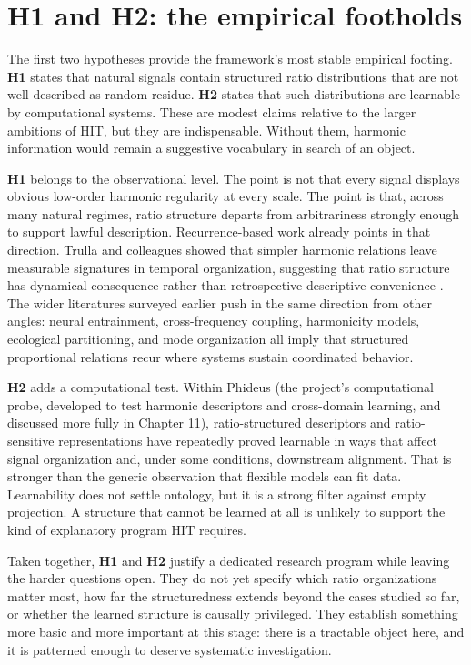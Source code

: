 \section{H1 and H2: the empirical footholds}

The first two hypotheses provide the framework's most stable empirical footing. \textbf{H1} states that natural signals contain structured ratio distributions that are not well described as random residue. \textbf{H2} states that such distributions are learnable by computational systems. These are modest claims relative to the larger ambitions of HIT, but they are indispensable. Without them, harmonic information would remain a suggestive vocabulary in search of an object.

\textbf{H1} belongs to the observational level. The point is not that every signal displays obvious low-order harmonic regularity at every scale. The point is that, across many natural regimes, ratio structure departs from arbitrariness strongly enough to support lawful description. Recurrence-based work already points in that direction. Trulla and colleagues showed that simpler harmonic relations leave measurable signatures in temporal organization, suggesting that ratio structure has dynamical consequence rather than retrospective descriptive convenience \parencite{trulla_2018}. The wider literatures surveyed earlier push in the same direction from other angles: neural entrainment, cross-frequency coupling, harmonicity models, ecological partitioning, and mode organization all imply that structured proportional relations recur where systems sustain coordinated behavior.

\textbf{H2} adds a computational test. Within Phideus (the project's computational probe, developed to test harmonic descriptors and cross-domain learning, and discussed more fully in Chapter 11), ratio-structured descriptors and ratio-sensitive representations have repeatedly proved learnable in ways that affect signal organization and, under some conditions, downstream alignment. That is stronger than the generic observation that flexible models can fit data. Learnability does not settle ontology, but it is a strong filter against empty projection. A structure that cannot be learned at all is unlikely to support the kind of explanatory program HIT requires.

Taken together, \textbf{H1} and \textbf{H2} justify a dedicated research program while leaving the harder questions open. They do not yet specify which ratio organizations matter most, how far the structuredness extends beyond the cases studied so far, or whether the learned structure is causally privileged. They establish something more basic and more important at this stage: there is a tractable object here, and it is patterned enough to deserve systematic investigation.


